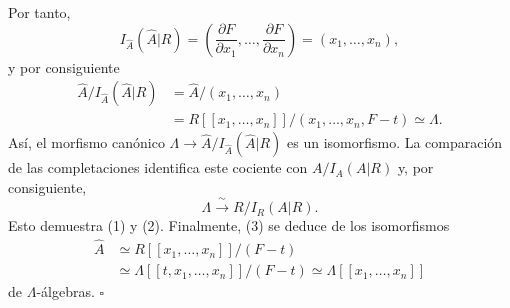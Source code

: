 Por tanto,
\[
I_{\widehat A}(\widehat A|R)
=\left(\frac{\partial F}{\partial x_1},\ldots,
       \frac{\partial F}{\partial x_n}\right)
=(x_1,\ldots,x_n),
\]
y por consiguiente
\[
\begin{aligned}
\widehat A/I_{\widehat A}(\widehat A|R)
&=\widehat A/(x_1,\ldots,x_n)\\
&=R[[x_1,\ldots,x_n]]/(x_1,\ldots,x_n,F-t)
 \simeq\Lambda.
\end{aligned}
\]
Así, el morfismo canónico
$\Lambda\longrightarrow
\widehat A/I_{\widehat A}(\widehat A|R)$ es un isomorfismo. La
comparación de las completaciones identifica este cociente con
$A/I_A(A|R)$ y, por consiguiente,
\[
\Lambda\xrightarrow{\ \sim\ }R/I_R(A|R).
\]
Esto demuestra (1) y (2). Finalmente, (3) se deduce de los
isomorfismos
\[
\begin{aligned}
\widehat A
&\simeq R[[x_1,\ldots,x_n]]/(F-t)\\
&\simeq\Lambda[[t,x_1,\ldots,x_n]]/(F-t)
 \simeq\Lambda[[x_1,\ldots,x_n]]
\end{aligned}
\]
de $\Lambda$-álgebras.
\hfill$\square$
